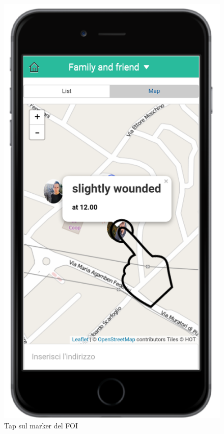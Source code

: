 \begin{itemize}
\begin{figure}[H]
	\centering
	\includegraphics[scale=1]{interfaccia/tapmarker.png}
	\caption{Tap sul marker del FOI }
	\label{fig:tapmarker}
\end{figure}

\newpage


\end{itemize}
